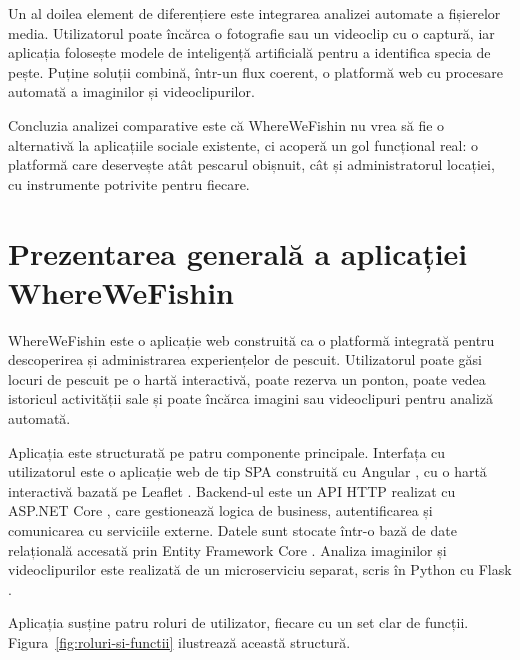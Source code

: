 Un al doilea element de diferențiere este integrarea analizei automate a fișierelor media. Utilizatorul poate încărca o fotografie sau un videoclip cu o captură, iar aplicația folosește modele de inteligență artificială pentru a identifica specia de pește. Puține soluții combină, într-un flux coerent, o platformă web cu procesare automată a imaginilor și videoclipurilor.

Concluzia analizei comparative este că WhereWeFishin nu vrea să fie o alternativă la aplicațiile sociale existente, ci acoperă un gol funcțional real: o platformă care deservește atât pescarul obișnuit, cât și administratorul locației, cu instrumente potrivite pentru fiecare.

\section{Prezentarea generală a aplicației WhereWeFishin}

WhereWeFishin este o aplicație web construită ca o platformă integrată pentru descoperirea și administrarea experiențelor de pescuit. Utilizatorul poate găsi locuri de pescuit pe o hartă interactivă, poate rezerva un ponton, poate vedea istoricul activității sale și poate încărca imagini sau videoclipuri pentru analiză automată.

Aplicația este structurată pe patru componente principale. Interfața cu utilizatorul este o aplicație web de tip SPA construită cu Angular \citep{angular}, cu o hartă interactivă bazată pe Leaflet \citep{leaflet}. Backend-ul este un API HTTP realizat cu ASP.NET Core \citep{aspnetcore}, care gestionează logica de business, autentificarea și comunicarea cu serviciile externe. Datele sunt stocate într-o bază de date relațională accesată prin Entity Framework Core \citep{efcore,sqlserver}. Analiza imaginilor și videoclipurilor este realizată de un microserviciu separat, scris în Python cu Flask \citep{flask}.

Aplicația susține patru roluri de utilizator, fiecare cu un set clar de funcții. Figura~\ref{fig:roluri-si-functii} ilustrează această structură.

